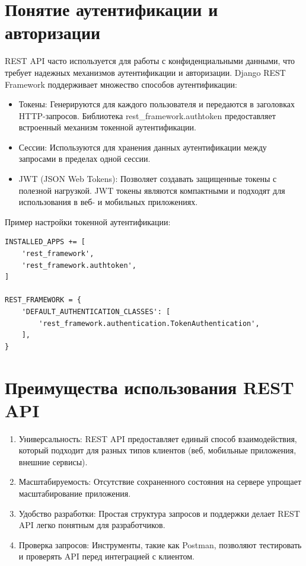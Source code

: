 \section{Понятие аутентификации и авторизации}
REST API часто используется для работы с конфиденциальными данными, что требует надежных механизмов аутентификации и авторизации. Django REST Framework поддерживает множество способов аутентификации:
\begin{itemize}
    \item Токены: Генерируются для каждого пользователя и передаются в заголовках HTTP-запросов. Библиотека rest\_framework.authtoken предоставляет встроенный механизм токенной аутентификации.
    \item Сессии: Используются для хранения данных аутентификации между запросами в пределах одной сессии.
    \item JWT (JSON Web Tokens): Позволяет создавать защищенные токены с полезной нагрузкой. JWT токены являются компактными и подходят для использования в веб- и мобильных приложениях.
\end{itemize}

Пример настройки токенной аутентификации:
\begin{verbatim}
INSTALLED_APPS += [
    'rest_framework',
    'rest_framework.authtoken',
]

REST_FRAMEWORK = {
    'DEFAULT_AUTHENTICATION_CLASSES': [
        'rest_framework.authentication.TokenAuthentication',
    ],
}
\end{verbatim}

\section{Преимущества использования REST API}
\begin{enumerate}
    \item Универсальность: REST API предоставляет единый способ взаимодействия, который подходит для разных типов клиентов (веб, мобильные приложения, внешние сервисы).
    \item Масштабируемость: Отсутствие сохраненного состояния на сервере упрощает масштабирование приложения.
    \item Удобство разработки: Простая структура запросов и поддержки делает REST API легко понятным для разработчиков.
    \item Проверка запросов: Инструменты, такие как Postman, позволяют тестировать и проверять API перед интеграцией с клиентом.
\end{enumerate}

